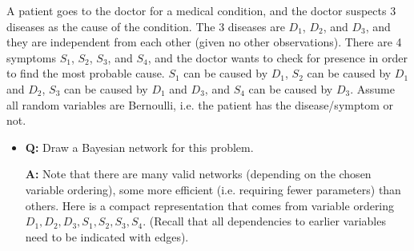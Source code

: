 \documentclass[11pt,letterpaper]{article}
\begin{document}
A patient goes to the doctor for a medical condition, and the doctor
suspects 3 diseases as the cause of the condition. The 3 diseases are
$D_1$, $D_2$, and $D_3$, and they are independent from each other
(given no other observations). There are 4 symptoms $S_1$, $S_2$,
$S_3$, and $S_4$, and the doctor wants to check for presence in order
to find the most probable cause.  $S_1$ can be caused by $D_1$, $S_2$
can be caused by $D_1$ and $D_2$, $S_3$ can be caused by $D_1$ and
$D_3$, and $S_4$ can be caused by $D_3$. Assume all random variables
are Bernoulli, i.e. the patient has the disease/symptom or not.
%
\begin{itemize}
\item \textbf{Q:} Draw a Bayesian network for this problem. 

\begin{solution}
\textbf{A:} Note that there are many valid networks (depending on the chosen variable ordering), 
some more efficient (i.e. requiring fewer parameters) than others. Here is a 
compact representation that comes from variable ordering $D_1, D_2, D_3, S_1, S_2, S_3, S_4$. (Recall that 
all dependencies to earlier variables need to be indicated with edges).
%
\begin{figure}[htp]
\begin{center}
\end{center}
\end{figure}

\end{solution}


\end{itemize}
\end{document}
